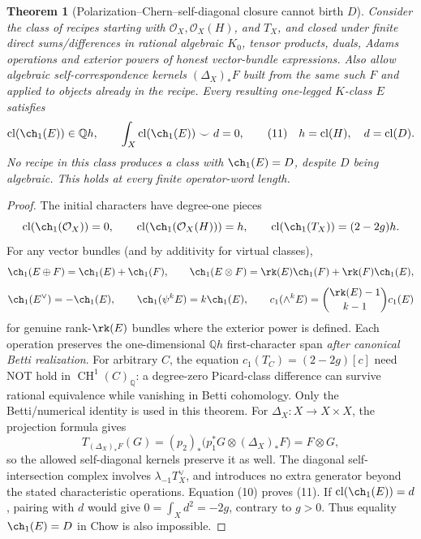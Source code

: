 \documentclass[11pt]{article}
\newcommand{\Q}{\mathbb Q}
\newcommand{\cl}{\operatorname{cl}}
\newcommand{\CH}{\operatorname{CH}}
\newtheorem{theorem}{Theorem}
\begin{document}
\begin{theorem}[Polarization--Chern--self-diagonal closure cannot birth \(D\)]
\label{th:tautological-no-go}
Consider the class of recipes starting with
\(\mathcal O_X,\mathcal O_X(H)\), and \(T_X\), and closed under finite
direct sums/differences in rational algebraic \(K_0\), tensor
products, duals, Adams operations and exterior powers of
honest vector-bundle expressions. Also allow algebraic
self-correspondence kernels \((\Delta_X)_*F\) built from the
same such \(F\) and applied to objects already in the recipe.
Every resulting one-legged \(K\)-class \(E\) satisfies
\[
       \cl(\ch_1(E))\in\Q h,\qquad
       \int_X\cl(\ch_1(E))\smile d=0,                \tag{11}
       \quad h=\cl(H),\quad d=\cl(D).
\]
No recipe in this class produces a class with
\(\ch_1(E)=D\), despite \(D\) being algebraic.
This holds at every finite operator-word length.
\end{theorem}
\begin{proof}
The initial characters have degree-one pieces
\[
 \cl(\ch_1(\mathcal O_X))=0,\qquad
 \cl(\ch_1(\mathcal O_X(H)))=h,\qquad
 \cl(\ch_1(T_X))=(2-2g)h .
\]
For any vector bundles (and by additivity for virtual classes),
\[
 \ch_1(E\oplus F)=\ch_1(E)+\ch_1(F),\qquad
 \ch_1(E\otimes F)=\rk(E)\ch_1(F)+\rk(F)\ch_1(E),
\]
\[
 \ch_1(E^\vee)=-\ch_1(E),\qquad
 \ch_1(\psi^kE)=k\ch_1(E),\qquad
 c_1(\wedge^kE)=\binom{\rk(E)-1}{k-1}c_1(E)
\]
for genuine rank-\(\rk(E)\) bundles where the exterior power
is defined. Each operation preserves the one-dimensional
\(\Q h\) first-character span \emph{after canonical Betti realization}.
For arbitrary \(C\), the equation
\(c_1(T_C)=(2-2g)[c]\) need NOT hold in
\(\CH^1(C)_\Q\): a degree-zero Picard-class difference can
survive rational equivalence while vanishing in Betti cohomology.
Only the Betti/numerical identity is used in this theorem.
For \(\Delta_X:X\to X\times X\), the projection formula gives
\[
 T_{(\Delta_X)_*F}(G)
  =(p_2)_*\bigl(p_1^*G\otimes(\Delta_X)_*F\bigr)
  =F\otimes G,                                      \tag{12}
\]
so the allowed self-diagonal kernels preserve it as well.
The diagonal self-intersection complex involves
\(\lambda_{-1}T_X^\vee\), and introduces no extra generator
beyond the stated characteristic operations.
Equation (10) proves (11).
If \(\cl(\ch_1(E))=d\), pairing with \(d\) would give
\(0=\int_X d^2=-2g\), contrary to \(g>0\).
Thus equality \(\ch_1(E)=D\) in Chow is also impossible.
\end{proof}
\end{document}
